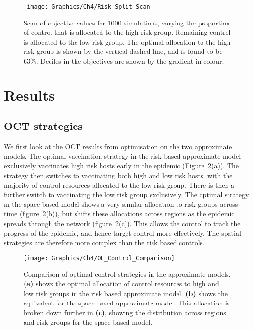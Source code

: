 \begin{figure}[t!]
    \begin{center}
        \texttt{[image: Graphics/Ch4/Risk\_Split\_Scan]}
        \caption[Optimisation of the Split strategy]{Scan of objective values for 1000 simulations, varying the proportion of control that is allocated to the high risk group. Remaining control is allocated to the low risk group. The optimal allocation to the high risk group is shown by the vertical dashed line, and is found to be 63\%. Deciles in the objectives are shown by the gradient in colour.}
        \label{fig:ch4:risk_split_scan}
    \end{center}
\end{figure}

\FloatBarrier
\newpage
\section{Results\label{sec:ch4:Results}}

\subsection{OCT strategies}

We first look at the OCT results from optimisation on the two approximate models. The optimal vaccination strategy in the risk based approximate model exclusively vaccinates high risk hosts early in the epidemic (Figure~\ref{fig:ch4:opt_control_comparison}(a)). The strategy then switches to vaccinating both high and low risk hosts, with the majority of control resources allocated to the low risk group. There is then a further switch to vaccinating the low risk group exclusively. The optimal strategy in the space based model shows a very similar allocation to risk groups across time (figure~\ref{fig:ch4:opt_control_comparison}(b)), but shifts these allocations across regions as the epidemic spreads through the network (figure~\ref{fig:ch4:opt_control_comparison}(c)). This allows the control to track the progress of the epidemic, and hence target control more effectively. The spatial strategies are therefore more complex than the risk based controls.

\begin{figure}[h]
    \begin{center}
        \texttt{[image: Graphics/Ch4/OL\_Control\_Comparison]}
        \caption[Optimised time-dependent control strategies]{Comparison of optimal control strategies in the approximate models. \textbf{(a)} shows the optimal allocation of control resources to high and low risk groups in the risk based approximate model. \textbf{(b)} shows the equivalent for the space based approximate model. This allocation is broken down further in \textbf{(c)}, showing the distribution across regions and risk groups for the space based model.}
        \label{fig:ch4:opt_control_comparison}
    \end{center}
\end{figure}

